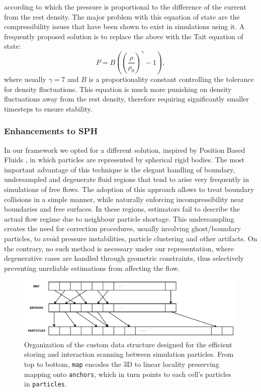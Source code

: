\documentclass{llncs}
\begin{document}
according to which the pressure is proportional to the difference of the current from the
rest density. The major problem with this equation of state are the compressibility issues
that have been shown to exist in simulations using it. A frequently proposed solution is
to replace the above with the Tait equation of state:
\begin{equation}
  \label{eq:tait-state}
  P = B \left( \left( \frac{\rho}{\rho_0} \right)^\gamma - 1 \right),
\end{equation}
where usually $\gamma=7$ and $B$ is a proportionality constant controlling the tolerance
for density fluctuations. This equation is much more punishing on density fluctuations
away from the rest density, therefore requiring significantly smaller timesteps to ensure
stability.

\subsubsection{Enhancements to SPH} In our framework we opted for a different solution,
inspired by Position Based Fluids \cite{macklin2013position}, in which particles are
represented by spherical rigid bodies. The most important advantage of this technique is
the elegant handling of boundary, undersampled and degenerate fluid regions that tend to
arise very frequently in simulations of free flows. The adoption of this approach allows
to treat boundary collisions in a simple manner, while naturally enforcing
incompressibility near boundaries and free surfaces. In these regions, estimators fail to
describe the actual flow regime due to neighbour particle shortage. This undersampling
creates the need for correction procedures, usually involving ghost/boundary particles, to
avoid pressure instabilities, particle clustering and other artifacts. On the contrary, no
such method is necessary under our representation, where degenerative cases are handled
through geometric constraints, thus selectively preventing unreliable estimations from
affecting the flow.

\begin{figure}
  \includegraphics[width=\textwidth]{figures/lp-grid.pdf}
  \caption{Organization of the custom data structure designed for the efficient storing
    and interaction scanning between simulation particles. From top to bottom,
    \texttt{map} encodes the 3D to linear locality preserving mapping onto
    \texttt{anchors}, which in turn points to each cell's particles in
    \texttt{particles}.}
  \label{fig:lp-grid}
\end{figure}
\end{document}
